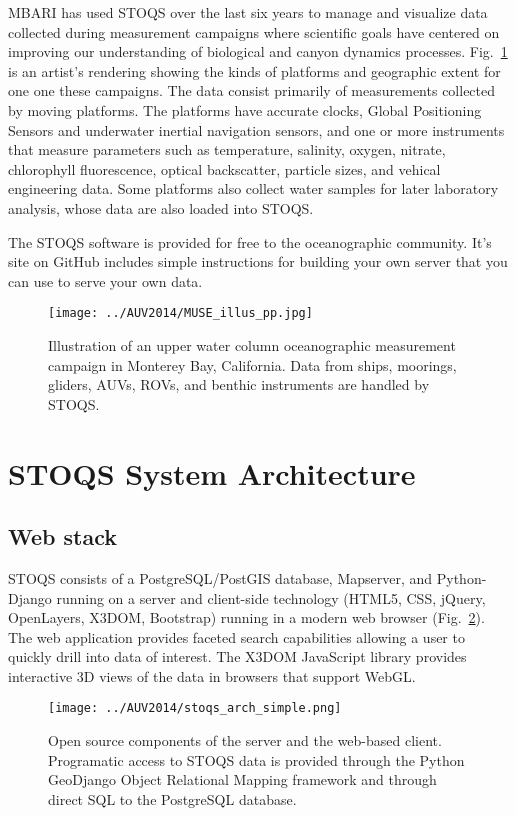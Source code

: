 \documentclass[conference]{IEEEtran}
\begin{document}
MBARI has used STOQS over the last six years to manage and visualize data collected 
during measurement campaigns where scientific goals have centered on improving 
our understanding of biological and canyon dynamics processes. Fig.~\ref{fig:MUSE_illus_pp} 
is an artist's rendering showing the kinds of platforms and geographic extent for one one 
these campaigns.  The data consist primarily of measurements 
collected by moving platforms. The platforms have accurate clocks, Global Positioning 
Sensors and underwater inertial navigation sensors, and one or more instruments that measure 
parameters such as temperature, salinity, oxygen, nitrate, chlorophyll fluorescence, 
optical backscatter, particle sizes, and vehical engineering data. Some platforms also collect
water samples for later laboratory analysis, whose data are also loaded into STOQS. 

The STOQS software is provided for free to the oceanographic community. It's site on
GitHub \cite{STOQS} includes simple instructions for building your own server that
you can use to serve your own data.

\begin{figure}[htbp]
\centering
\texttt{[image: ../AUV2014/MUSE\_illus\_pp.jpg]}
\caption{Illustration of an upper water column oceanographic measurement campaign in Monterey Bay, California. 
Data from ships, moorings, gliders, AUVs, ROVs, and benthic instruments are handled by STOQS.}
\label{fig:MUSE_illus_pp}
\end{figure}

\section{STOQS System Architecture}

\subsection{Web stack}

STOQS consists of a PostgreSQL/PostGIS database, Mapserver, and Python-Django 
running on a server and client-side technology (HTML5, CSS, jQuery, OpenLayers, 
X3DOM, Bootstrap) running in a modern web browser (Fig.~\ref{fig:STOQSArch}). 
The web application provides faceted search capabilities allowing a user to quickly 
drill into data of interest. The X3DOM JavaScript library provides interactive 
3D views of the data in browsers that support WebGL.  

\begin{figure}[htbp]
\centering
\texttt{[image: ../AUV2014/stoqs\_arch\_simple.png]}
\caption{Open source components of the server and the web-based client. Programatic access to 
STOQS data is provided through the Python GeoDjango Object Relational Mapping framework 
and through direct SQL to the PostgreSQL database.}
\label{fig:STOQSArch}
\end{figure}
\end{document}
